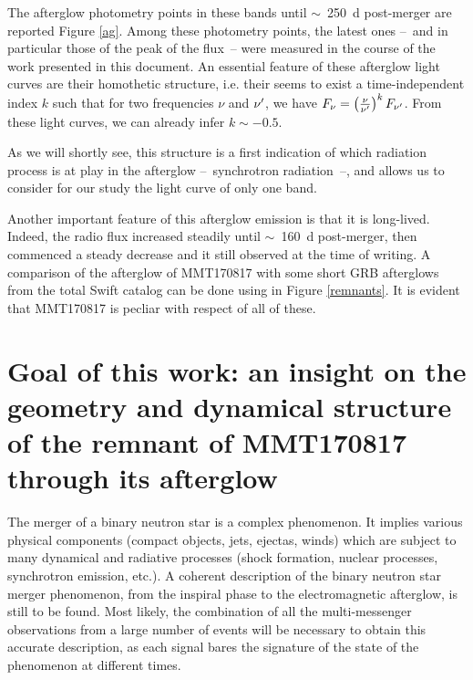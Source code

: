 The afterglow photometry points in these bands until $\sim$~250~d post-merger are reported Figure \ref{ag}. Among these photometry points, the latest ones --~and in particular those of the peak of the flux~-- were measured in the course of the work presented in this document. An essential feature of these afterglow light curves are their homothetic structure, i.e. their seems to exist a time-independent index $k$ such that for two frequencies $\nu$ and $\nu^{\prime}$, we have $F_\nu = \left( \frac{\nu}{\nu^{\prime}} \right)^k F_{\nu^{\prime}}$. From these light curves, we can already infer $k \sim -0.5$.


As we will shortly see, this structure is a first indication of which radiation process is at play in the afterglow --~synchrotron radiation~--, and allows us to consider for our study the light curve of only one band.


Another important feature of this afterglow emission is that it is long-lived. Indeed, the radio flux increased steadily until $\sim$~160~d post-merger, then commenced a steady decrease and it still observed at the time of writing. A comparison of the afterglow of MMT170817 with some short GRB afterglows from the total Swift catalog can be done using in Figure \ref{remnants}. It is evident that MMT170817 is pecliar with respect of all of these.


\section{Goal of this work: an insight on the geometry and dynamical structure of the remnant of MMT170817 through its afterglow}

The merger of a binary neutron star is a complex phenomenon. It implies various physical components (compact objects, jets, ejectas, winds) which are subject to many dynamical and radiative processes (shock formation, nuclear processes, synchrotron emission, etc.). A coherent description of the binary neutron star merger phenomenon, from the inspiral phase to the electromagnetic afterglow, is still to be found. Most likely, the combination of all the multi-messenger observations from a large number of events will be necessary to obtain this accurate description, as each signal bares the signature of the state of the phenomenon at different times.

